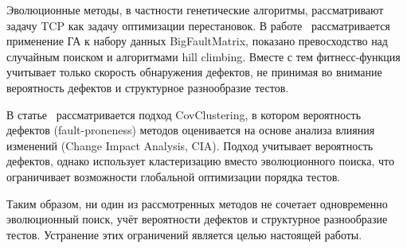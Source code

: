 Эволюционные методы, в частности генетические алгоритмы, рассматривают задачу TCP как задачу оптимизации перестановок.
В работе~\cite{paygude2020} рассматривается применение ГА к набору данных BigFaultMatrix, показано превосходство 
над случайным поиском и алгоритмами hill climbing. Вместе с тем фитнесс-функция учитывает только скорость 
обнаружения дефектов, не принимая во внимание вероятность дефектов и структурное разнообразие тестов.

В статье~\cite{mahdieh2021} рассматривается подход CovClustering, в котором вероятность дефектов (fault-proneness)
методов оценивается на основе анализа влияния изменений (Change Impact Analysis, CIA). Подход учитывает вероятность
дефектов, однако использует кластеризацию вместо эволюционного поиска, что ограничивает возможности глобальной 
оптимизации порядка тестов.

Таким образом, ни один из рассмотренных методов не сочетает одновременно эволюционный поиск, учёт вероятности 
дефектов и структурное разнообразие тестов. Устранение этих ограничений является целью настоящей работы.